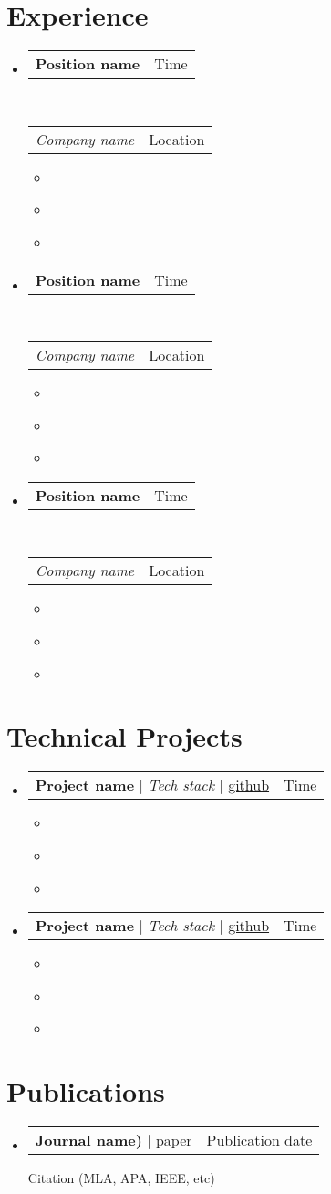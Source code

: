 \documentclass[letterpaper,10pt]{article}
\makeatletter
\def\spacing{-5pt}
\def\sectionSpacing{-14pt}
\newcommand{\resumeItem}[1]{
  \item\small{
    {#1 \vspace{-2pt}}
  }
}
\newcommand{\resumeProjectHeading}[2]{
    \item
    \begin{tabular*}{0.97\textwidth}{l@{\extracolsep{\fill}}r}
      \small#1 & \small#2 \\
    \end{tabular*}\vspace{-7pt}
}
\newcommand{\publicationHeading}[2]{
    \item
    \begin{tabular*}{0.97\textwidth}{l@{\extracolsep{\fill}}r}
      \small#1 & \small#2 \\
    \end{tabular*}
}
\newcommand{\resumeExpHeading}[4]{
    \item
    \begin{tabular*}{0.97\textwidth}{l@{\extracolsep{\fill}}r}
      \small#1 & \small#2 \\
    \end{tabular*} \\
    \begin{tabular*}{0.97\textwidth}{l@{\extracolsep{\fill}}r}
      \textit{\fontsize{10pt}{10pt}\selectfont#3} & \small#4 \\
    \end{tabular*}
    \vspace{-6pt}
}
\newcommand{\resumeSubHeadingListStart}{\begin{itemize}[leftmargin=0.15in, label={}]}
\newcommand{\resumeSubHeadingListEnd}{\end{itemize}}
\newcommand{\resumeItemListStart}{\begin{itemize}}
\newcommand{\resumeItemListEnd}{\end{itemize}\vspace{-5pt}}
\makeatother
\begin{document}
\vspace{\sectionSpacing}
\section{Experience}
    \resumeSubHeadingListStart
        \resumeExpHeading
        {\textbf{Position name}}{Time}{Company name}{Location}
        \resumeItemListStart
            \resumeItem{}
            \resumeItem{}
            \resumeItem{}
        \resumeItemListEnd
        \vspace{\spacing}
        \resumeExpHeading
          {\textbf{Position name}}{Time}{Company name}{Location}
          \resumeItemListStart
            \resumeItem{}
            \resumeItem{}
            \resumeItem{}
        \resumeItemListEnd
        \vspace{\spacing}
        \resumeExpHeading
          {\textbf{Position name}}{Time}{Company name}{Location}
        \resumeItemListStart
            \resumeItem{}
            \resumeItem{}
            \resumeItem{}
        \resumeItemListEnd
    \resumeSubHeadingListEnd 

\vspace{\sectionSpacing}
\section{Technical Projects}
    \resumeSubHeadingListStart
        \resumeProjectHeading
        {\textbf{Project name} $|$ \footnotesize\emph{Tech stack} $|$ \href{link}{github}}{Time}
        \resumeItemListStart
            \resumeItem{}
            \resumeItem{}
            \resumeItem{}
        \resumeItemListEnd
        \vspace{\spacing}
        
        \resumeProjectHeading
        {\textbf{Project name} $|$ \footnotesize\emph{Tech stack} $|$ \href{link}{github}}{Time}
        \resumeItemListStart
            \resumeItem{}
            \resumeItem{}
            \resumeItem{}
        \resumeItemListEnd
    \resumeSubHeadingListEnd

\vspace{\sectionSpacing}
\section{Publications}
\resumeSubHeadingListStart

\publicationHeading
  {\textbf{Journal name)} $|$ \href{link}{paper}\vspace{8pt}}{Publication date} %
  {\small{Citation (MLA, APA, IEEE, etc)}}
\resumeSubHeadingListEnd
\end{document}
